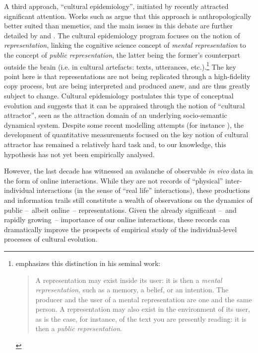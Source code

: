 A third approach, ``cultural epidemiology'', initiated by \citet{sper:expl} recently attracted significant attention.
Works such as \citet{Atran03} argue that this approach is anthropologically better suited than memetics, and the main issues in this debate are further detailed by \citet{Kuper00} and \citet{Bloch00}.
The cultural epidemiology program focuses on the notion of \emph{representation}, linking the cognitive science concept of \emph{mental representation} to the concept of \emph{public representation}, the latter being the former's counterpart outside the brain (i.e. in cultural artefacts: texts, utterances, etc.).\footnote{\citet{sper:expl} emphasizes this distinction in his seminal work:
\begin{quotation}
A representation may exist inside its user: it is then a \emph{mental representation}, such as a memory, a belief, or an intention.
The producer and the user of a mental representation are one and the same person.
A representation may also exist in the environment of its user, as is the case, for instance, of the text you are presently reading: it is then a \emph{public representation}.
\end{quotation}}
The key point here is that representations are not being replicated through a high-fidelity copy process, but are being interpreted and produced anew, and are thus greatly subject to change.
Cultural epidemiology postulates this type of conceptual evolution and suggests that it can be appraised through the notion of ``cultural attractor'', seen as the attraction domain of an underlying socio-semantic dynamical system.
Despite some recent modelling attempts (for instance \citet{Claidiere07}), the development of quantitative measurements focused on the key notion of cultural attractor has remained a relatively hard task and, to our knowledge, this hypothesis has not yet been empirically analysed.

However, the last decade has witnessed an avalanche of observable \emph{in vivo} data in the form of online interactions.
While they are not records of ``physical'' inter-individual interactions (in the sense of ``real life'' interactions), these productions and information trails still constitute a wealth of observations on the dynamics of public --~albeit online~-- representations.
Given the already significant --~and rapidly growing~-- importance of our online interactions, these records can dramatically improve the prospects of empirical study of the individual-level processes of cultural evolution.

